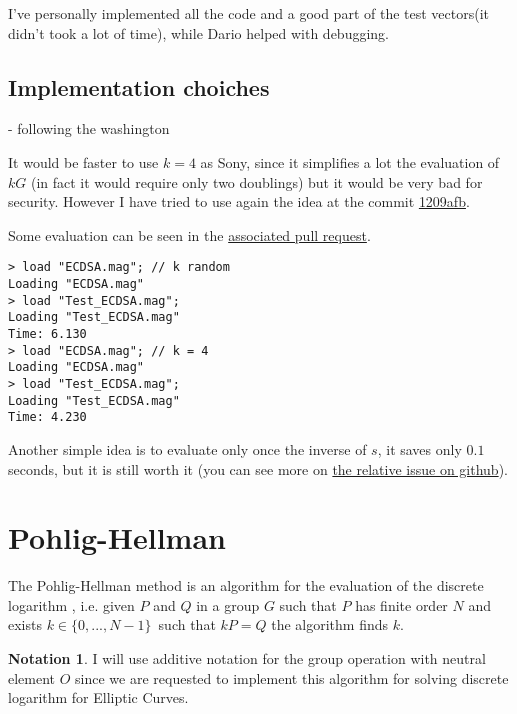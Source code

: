 \documentclass{article}
\theoremstyle{plain}
\theoremstyle{remark}
\theoremstyle{definition}
\newtheorem*{nota}{Notation}
\begin{document}



I've personally implemented all the code and a good part of the test vectors(it didn't took a lot of time), while Dario helped with debugging.

\subsection{Implementation choiches}

- following the washington

It would be faster to use $k = 4$ as Sony, since it simplifies a lot the evaluation of $kG$ (in fact it would require only two doublings) but it would be very bad for security. However I have tried to use again the idea at the commit \href{https://github.com/giacomoborin/project2_MAGMA/commit/1209afbbb3bed86d26ebf342bf6f43453de3e795}{1209afb}.

Some evaluation can be seen in the \href{https://github.com/giacomoborin/project2_MAGMA/pull/36}{associated pull request}.

\begin{lstlisting}[language = magma]
> load "ECDSA.mag"; // k random
Loading "ECDSA.mag"
> load "Test_ECDSA.mag";
Loading "Test_ECDSA.mag"
Time: 6.130
> load "ECDSA.mag"; // k = 4    
Loading "ECDSA.mag"
> load "Test_ECDSA.mag";
Loading "Test_ECDSA.mag"
Time: 4.230
\end{lstlisting}


Another simple idea is to evaluate only once the inverse of $s$, it saves only $0.1$ seconds, but it is still worth it (you can see more on \href{https://github.com/giacomoborin/project2_MAGMA/issues/13}{the relative issue on github}).

\section{Pohlig-Hellman}

The Pohlig-Hellman method is an algorithm for the evaluation of the discrete logarithm %
, i.e. given $P$ and $Q$ in a group $G$ such that $P$ has finite order $N$ and exists $k\in \{0,...,N-1\}$ such that $kP = Q$ the algorithm finds $k$. 

\begin{nota}
	I will use additive notation for the group operation with neutral element $O$ since we are requested to implement this algorithm for solving discrete logarithm for Elliptic Curves. 
\end{nota}
\end{document}
